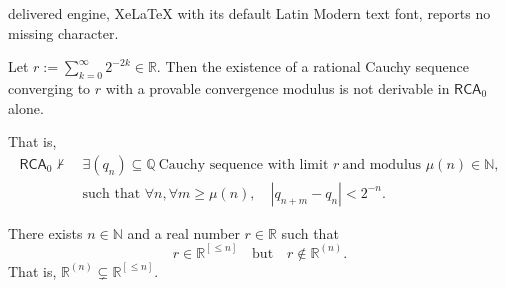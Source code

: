 \documentclass[10pt,a4paper]{amsart}
\begin{document}
delivered engine, XeLaTeX with its default Latin Modern text font, reports no missing character.
\begin{lemma}
\label{lemma:RCA0-incompleteness}
Let \( r := \sum_{k=0}^\infty 2^{-2k} \in \mathbb{R} \). Then the existence of a rational Cauchy sequence converging to \( r \) with a provable convergence modulus is not derivable in \( \mathsf{RCA}_0 \) alone.

That is,
\begin{align*}
    \mathsf{RCA}_0 \nvdash\ &\exists (q_n) \subseteq \mathbb{Q} \ \text{Cauchy sequence with limit } r \ \text{and modulus } \mu(n) \in \mathbb{N}, \\
    &\text{such that } \forall n, \forall m \geq \mu(n), \quad |q_{n+m} - q_n| < 2^{-n}.
\end{align*}
\end{lemma}

\begin{theorem}
\label{thm:noncollapse}
There exists \( n \in \mathbb{N} \) and a real number \( r \in \mathbb{R} \) such that
\[
    r \in \mathbb{R}^{[\leq n]} \quad \text{but} \quad r \notin \mathbb{R}^{(n)}.
\]
That is, \( \mathbb{R}^{(n)} \subsetneq \mathbb{R}^{[\leq n]} \).
\end{theorem}
\end{document}

